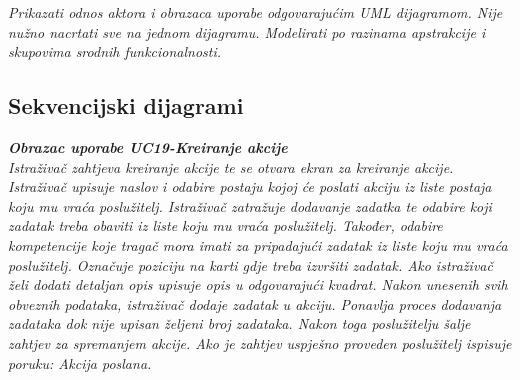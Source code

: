 					\textit{Prikazati odnos aktora i obrazaca uporabe odgovarajućim UML dijagramom. Nije nužno nacrtati sve na jednom dijagramu. Modelirati po razinama apstrakcije i skupovima srodnih funkcionalnosti.}
				\eject		
				
			\subsection{Sekvencijski dijagrami}
				
				\textbf{\textit{Obrazac uporabe UC19-Kreiranje akcije}}\\
				
				\textit{Istraživač zahtjeva kreiranje akcije te se otvara ekran za kreiranje akcije. Istraživač upisuje naslov i odabire postaju kojoj će poslati akciju iz liste postaja koju mu vraća poslužitelj. Istraživač zatražuje dodavanje zadatka te odabire koji zadatak treba obaviti iz liste koju mu vraća poslužitelj. Također, odabire kompetencije koje tragač mora imati za pripadajući zadatak iz liste koju mu vraća poslužitelj. Označuje poziciju na karti gdje treba izvršiti zadatak. Ako istraživač želi dodati detaljan opis upisuje opis u odgovarajući kvadrat. Nakon unesenih svih obveznih podataka, istraživač dodaje zadatak u akciju. Ponavlja proces dodavanja zadataka dok nije upisan željeni broj zadataka. Nakon toga poslužitelju šalje zahtjev za spremanjem akcije. Ako je zahtjev uspješno proveden poslužitelj ispisuje poruku: Akcija poslana.}
